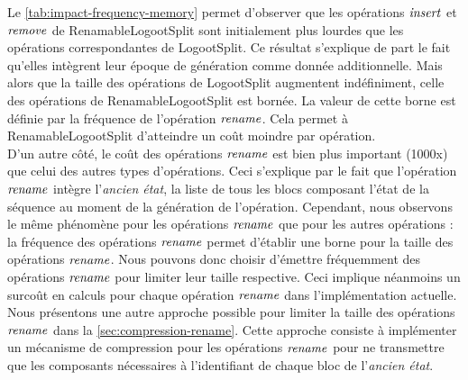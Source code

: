 Le \autoref{tab:impact-frequency-memory} permet d'observer que les opérations $\mathit{insert}$ et $\mathit{remove}$ de RenamableLogootSplit sont initialement plus lourdes que les opérations correspondantes de LogootSplit.
Ce résultat s'explique de part le fait qu'elles intègrent leur époque de génération comme donnée additionnelle.
Mais alors que la taille des opérations de LogootSplit augmentent indéfiniment, celle des opérations de RenamableLogootSplit est bornée.
La valeur de cette borne est définie par la fréquence de l'opération $\mathit{rename}$.
Cela permet à RenamableLogootSplit d'atteindre un coût moindre par opération.\\

D'un autre côté, le coût des opérations $\mathit{rename}$ est bien plus important (1000x) que celui des autres types d'opérations.
Ceci s'explique par le fait que l'opération $\mathit{rename}$ intègre l'\emph{ancien état}, \ie la liste de tous les blocs composant l'état de la séquence au moment de la génération de l'opération.
Cependant, nous observons le même phénomène pour les opérations $\mathit{rename}$ que pour les autres opérations : la fréquence des opérations $\mathit{rename}$ permet d'établir une borne pour la taille des opérations $\mathit{rename}$.
Nous pouvons donc choisir d'émettre fréquemment des opérations $\mathit{rename}$ pour limiter leur taille respective.
Ceci implique néanmoins un surcoût en calculs pour chaque opération $\mathit{rename}$ dans l'implémentation actuelle.
Nous présentons une autre approche possible pour limiter la taille des opérations $\mathit{rename}$ dans la \autoref{sec:compression-rename}.
Cette approche consiste à implémenter un mécanisme de compression pour les opérations $\mathit{rename}$ pour ne transmettre que les composants nécessaires à l'identifiant de chaque bloc de l'\emph{ancien état}.
